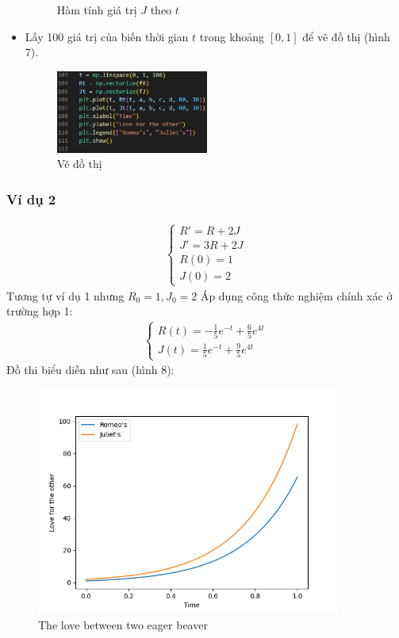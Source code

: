 \begin{itemize}
\begin{figure}[h!]
\begin{center}
        \end{center}
        \caption{Hàm tính giá trị $J$ theo $t$}
    \end{figure}
    \item Lấy 100 giá trị của biến thời gian $t$ trong khoảng $[0,1]$ để vẽ đồ thị (hình 7).
    \begin{figure}[h!]
        \begin{center}
        \includegraphics[width=5cm]{images/trajectory.png}
        \end{center}
        \caption{Vẽ đồ thị}
    \end{figure}
\end{itemize}
\subsubsection{Ví dụ 2}
\begin{align*}
    \begin{cases}
        R'=R+2J\\
        J'=3R+2J\\
        R(0)=1\\
        J(0)=2
    \end{cases}
\end{align*}
Tương tự ví dụ 1 nhưng $R_0=1, J_0=2$
Áp dụng công thức nghiệm chính xác ở trường hợp 1:
\begin{align*}
    \begin{cases}
        R(t)=-\frac{1}{5}e^{-t}+\frac{6}{5}e^{4t}\\
        J(t)=\frac{1}{5}e^{-t}+\frac{9}{5}e^{4t}
    \end{cases}
\end{align*}
Đồ thi biểu diễn như sau (hình 8):
\begin{figure}[h!]
    \begin{center}
    \includegraphics[width=10cm]{images/eager_beaver_2.png}
    \end{center}
    \caption{The love between two eager beaver}
\end{figure}
